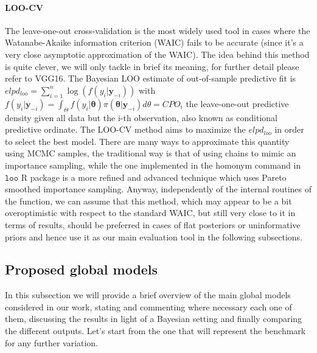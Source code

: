 \documentclass[11pt,twoside]{report}
\begin{document}
\paragraph{LOO-CV} The leave-one-out cross-validation is the most widely used tool in cases where the Watanabe-Akaike information criterion (WAIC) fails to be accurate (since it's a very close asymptotic approximation of the WAIC). The idea behind this method is quite clever, we will only tackle in brief its meaning, for further detail please refer to VGG16. The Bayesian LOO estimate of out-of-sample predictive fit is  
$elpd_{loo}= \sum_{i=1}^n \log(f(y_i|\mathbf{y}_{-i}))$ with $f(y_i|\mathbf{y}_{-i}) = \int_{\Theta}f(y_i|\boldsymbol{\theta})\pi(\boldsymbol{\theta}|\mathbf{y}_{-i})d\theta =CPO_i$
the leave-one-out predictive density given all data but the i-th observation, also known as conditional predictive ordinate. The LOO-CV method aims to maximize the $ elpd_{loo} $ in order to select the best model. There are many ways to approximate this quantity using MCMC samples, the traditional way is that of using chains to mimic an importance sampling, while the one implemented in the homonym command in $ \texttt{loo} $ R package is a more refined and advanced technique which uses Pareto smoothed importance sampling. Anyway, independently of the internal routines of the function, we can assume that this method, which may appear to be a bit overoptimistic with respect to the standard WAIC, but still very close to it in terms of results, should be preferred in cases of flat posteriors or uninformative priors and hence use it as our main evaluation tool in the following subsections.

\subsection{Proposed global models}
In this subsection we will provide a brief overview of the main global models considered in our work, stating and commenting where necessary each one of them, discussing the results in light of a Bayesian setting and finally comparing the different outputs. Let's start from the one that will represent the benchmark for any further variation.
\end{document}
